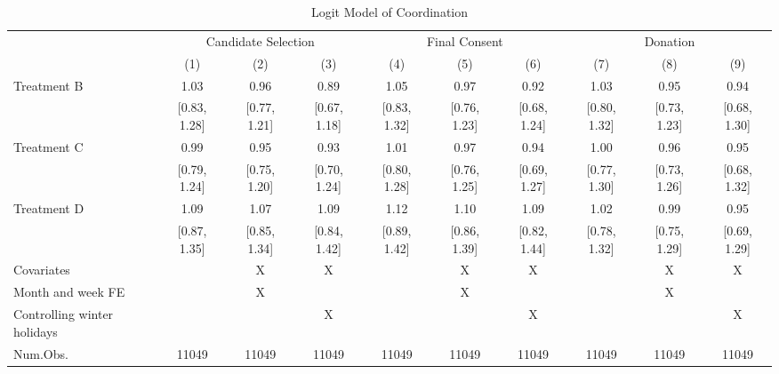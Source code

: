 \documentclass[12pt, a4paper]{article}
\begin{document}
\begin{landscape}\begin{table}[H]

\caption{\label{tab:coordinate-logit}Logit Model of Coordination}
\centering
\fontsize{8}{10}\selectfont
\begin{threeparttable}
\begin{tabular}[t]{lccccccccc}
\toprule
\multicolumn{1}{c}{ } & \multicolumn{3}{c}{Candidate Selection} & \multicolumn{3}{c}{Final Consent} & \multicolumn{3}{c}{Donation} \\
\cmidrule(l{3pt}r{3pt}){2-4} \cmidrule(l{3pt}r{3pt}){5-7} \cmidrule(l{3pt}r{3pt}){8-10}
  & (1) & (2) & (3) & (4) & (5) & (6) & (7) & (8) & (9)\\
\midrule
Treatment B & \num{1.03} & \num{0.96} & \num{0.89} & \num{1.05} & \num{0.97} & \num{0.92} & \num{1.03} & \num{0.95} & \num{0.94}\\
 & {}[\num{0.83}, \num{1.28}] & {}[\num{0.77}, \num{1.21}] & {}[\num{0.67}, \num{1.18}] & {}[\num{0.83}, \num{1.32}] & {}[\num{0.76}, \num{1.23}] & {}[\num{0.68}, \num{1.24}] & {}[\num{0.80}, \num{1.32}] & {}[\num{0.73}, \num{1.23}] & {}[\num{0.68}, \num{1.30}]\\
Treatment C & \num{0.99} & \num{0.95} & \num{0.93} & \num{1.01} & \num{0.97} & \num{0.94} & \num{1.00} & \num{0.96} & \num{0.95}\\
 & {}[\num{0.79}, \num{1.24}] & {}[\num{0.75}, \num{1.20}] & {}[\num{0.70}, \num{1.24}] & {}[\num{0.80}, \num{1.28}] & {}[\num{0.76}, \num{1.25}] & {}[\num{0.69}, \num{1.27}] & {}[\num{0.77}, \num{1.30}] & {}[\num{0.73}, \num{1.26}] & {}[\num{0.68}, \num{1.32}]\\
Treatment D & \num{1.09} & \num{1.07} & \num{1.09} & \num{1.12} & \num{1.10} & \num{1.09} & \num{1.02} & \num{0.99} & \num{0.95}\\
 & {}[\num{0.87}, \num{1.35}] & {}[\num{0.85}, \num{1.34}] & {}[\num{0.84}, \num{1.42}] & {}[\num{0.89}, \num{1.42}] & {}[\num{0.86}, \num{1.39}] & {}[\num{0.82}, \num{1.44}] & {}[\num{0.78}, \num{1.32}] & {}[\num{0.75}, \num{1.29}] & {}[\num{0.69}, \num{1.29}]\\
\midrule
Covariates &  & X & X &  & X & X &  & X & X\\
Month and week FE &  & X &  &  & X &  &  & X & \\
Controlling winter holidays &  &  & X &  &  & X &  &  & X\\
Num.Obs. & \num{11049} & \num{11049} & \num{11049} & \num{11049} & \num{11049} & \num{11049} & \num{11049} & \num{11049} & \num{11049}\\

\end{tabular}
\end{threeparttable}
\end{table}
\end{landscape}
\end{document}
